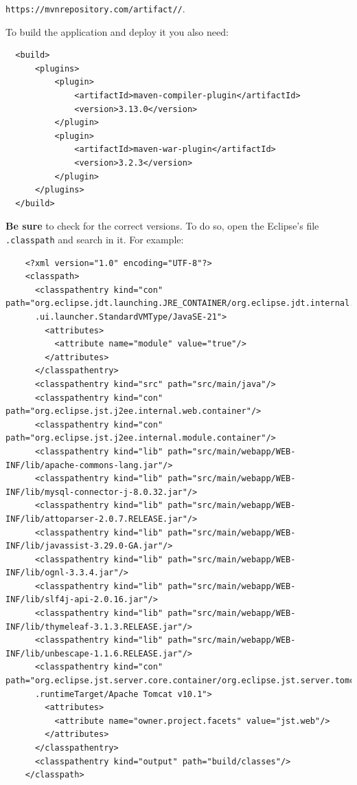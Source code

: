 \begin{center}
  \texttt{https://mvnrepository.com/artifact//}.
\end{center}

To build the application and deploy it you also need:
\begin{verbatim}
  <build>
      <plugins>
          <plugin>
              <artifactId>maven-compiler-plugin</artifactId>
              <version>3.13.0</version>
          </plugin>
          <plugin>
              <artifactId>maven-war-plugin</artifactId>
              <version>3.2.3</version>
          </plugin>
      </plugins>
  </build>
\end{verbatim}

\begin{warning}{}
  \textbf{Be sure} to check for the correct versions. To do so, open the Eclipse's file \texttt{.classpath} and search in it. For example:
  {\scriptsize
    \begin{verbatim}
    <?xml version="1.0" encoding="UTF-8"?>
    <classpath>
      <classpathentry kind="con" path="org.eclipse.jdt.launching.JRE_CONTAINER/org.eclipse.jdt.internal.debug
      .ui.launcher.StandardVMType/JavaSE-21">
        <attributes>
          <attribute name="module" value="true"/>
        </attributes>
      </classpathentry>
      <classpathentry kind="src" path="src/main/java"/>
      <classpathentry kind="con" path="org.eclipse.jst.j2ee.internal.web.container"/>
      <classpathentry kind="con" path="org.eclipse.jst.j2ee.internal.module.container"/>
      <classpathentry kind="lib" path="src/main/webapp/WEB-INF/lib/apache-commons-lang.jar"/>
      <classpathentry kind="lib" path="src/main/webapp/WEB-INF/lib/mysql-connector-j-8.0.32.jar"/>
      <classpathentry kind="lib" path="src/main/webapp/WEB-INF/lib/attoparser-2.0.7.RELEASE.jar"/>
      <classpathentry kind="lib" path="src/main/webapp/WEB-INF/lib/javassist-3.29.0-GA.jar"/>
      <classpathentry kind="lib" path="src/main/webapp/WEB-INF/lib/ognl-3.3.4.jar"/>
      <classpathentry kind="lib" path="src/main/webapp/WEB-INF/lib/slf4j-api-2.0.16.jar"/>
      <classpathentry kind="lib" path="src/main/webapp/WEB-INF/lib/thymeleaf-3.1.3.RELEASE.jar"/>
      <classpathentry kind="lib" path="src/main/webapp/WEB-INF/lib/unbescape-1.1.6.RELEASE.jar"/>
      <classpathentry kind="con" path="org.eclipse.jst.server.core.container/org.eclipse.jst.server.tomcat
      .runtimeTarget/Apache Tomcat v10.1">
        <attributes>
          <attribute name="owner.project.facets" value="jst.web"/>
        </attributes>
      </classpathentry>
      <classpathentry kind="output" path="build/classes"/>
    </classpath>
    \end{verbatim}
  }


\end{warning}
